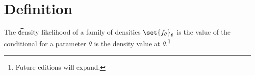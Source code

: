 
\section*{Definition}

The \t{density likelihood} of a family of densities $\set{f_{\theta }}_{\theta }$ is the value of the conditional for a parameter $\theta $ is the density value at $\theta $.\footnote{Future editions will expand.}

\blankpage